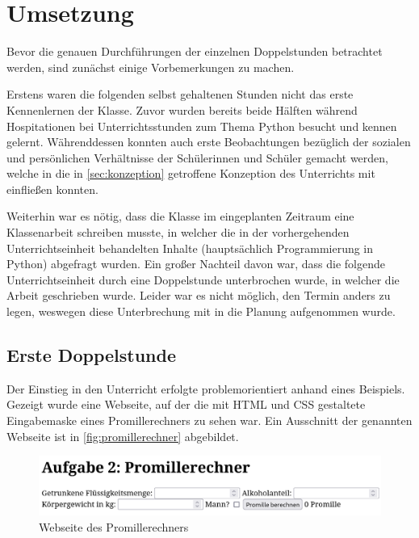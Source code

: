 \section{Umsetzung}
\label{sec:umsetzung}

Bevor die genauen Durchführungen der einzelnen Doppelstunden betrachtet werden, sind zunächst einige Vorbemerkungen zu machen.

Erstens waren die folgenden selbst gehaltenen Stunden nicht das erste Kennenlernen der Klasse.
Zuvor wurden bereits beide Hälften während Hospitationen bei Unterrichtsstunden zum Thema Python besucht und kennen gelernt.
Währenddessen konnten auch erste Beobachtungen bezüglich der sozialen und persönlichen Verhältnisse der Schülerinnen und Schüler gemacht werden, welche in die in \autoref{sec:konzeption} getroffene Konzeption des Unterrichts mit einfließen konnten.

Weiterhin war es nötig, dass die Klasse im eingeplanten Zeitraum eine Klassenarbeit schreiben musste, in welcher die in der vorhergehenden Unterrichtseinheit behandelten Inhalte (hauptsächlich Programmierung in Python) abgefragt wurden.
Ein großer Nachteil davon war, dass die folgende Unterrichtseinheit durch eine Doppelstunde unterbrochen wurde, in welcher die Arbeit geschrieben wurde.
Leider war es nicht möglich, den Termin anders zu legen, weswegen diese Unterbrechung mit in die Planung aufgenommen wurde.


\subsection{Erste Doppelstunde}
\label{subsec:doppelstunde-1}

Der Einstieg in den Unterricht erfolgte problemorientiert anhand eines Beispiels.
Gezeigt wurde eine Webseite, auf der die mit HTML und CSS gestaltete Eingabemaske eines Promillerechners zu sehen war.
Ein Ausschnitt der genannten Webseite ist in \autoref{fig:promillerechner} abgebildet.

\begin{figure}[h!]
	\centering
	\includegraphics[width=\textwidth]{media/Promillerechner.png}
	\caption{Webseite des Promillerechners}
	\label{fig:promillerechner}
\end{figure}

